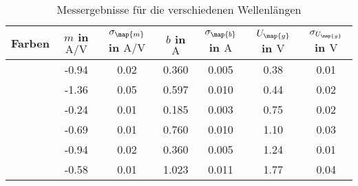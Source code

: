 \begin{table}
\centering
\caption{Messergebnisse für die verschiedenen Wellenlängen}
\label{tab: messergebnisse}
\begin{tabular}{ S S S S S S S }
\toprule
 {Farben} & {$m$ in $\si{\ampere\per\volt}$} & { $\sigma_{\map{m}}$ in $\si{\ampere\per\volt}$ } & { $b$ in $\si{\ampere}$} & { $\sigma_{\map{b}}$ in $\si{\ampere}$} & {$U_{\map{g}}$ in $\si{\volt}$ } & { $\sigma_{U_{\map{g}}}$ in $\si{\volt}$}     \\
\midrule
{}       & -0.94  & 0.02  & 0.360  & 0.005  & 0.38  & 0.01\\
       &  -1.36  & 0.05  & 0.597  & 0.010  & 0.44  & 0.02\\
                   &  -0.24  & 0.01  & 0.185  & 0.003  & 0.75  & 0.02\\
                  &  -0.69  & 0.01  & 0.760  & 0.010  & 1.10  & 0.03\\
                  &  -0.94  & 0.02  & 0.360  & 0.005  & 1.24  & 0.01\\
                   &  -0.58  & 0.01  & 1.023  & 0.011  & 1.77  & 0.04\\                      
\bottomrule
\end{tabular}
\end{table}
